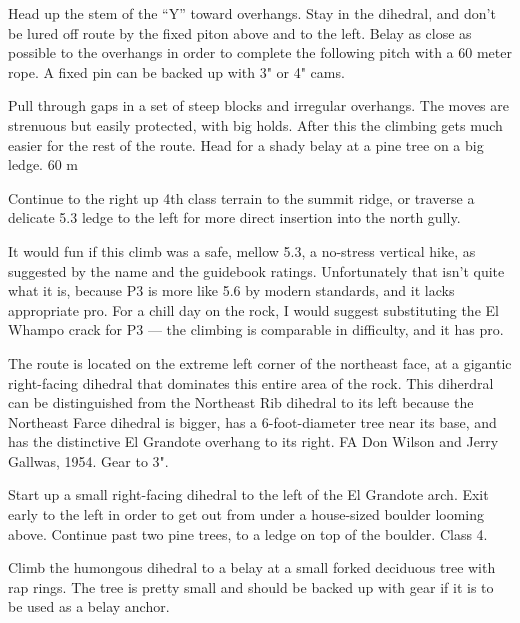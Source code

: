 \documentclass{tahquitz}
\begin{document}
 Head up the stem of the ``Y'' toward overhangs. Stay in the
dihedral, and don't be lured off route by the fixed piton above and
to the left. Belay as close as possible to the overhangs in order to
complete the following pitch with a 60 meter rope. A fixed pin can be
backed up with 3" or 4" cams.

 Pull through gaps in a set of steep blocks and irregular
overhangs. The  moves are strenuous but easily protected, with big
holds. After this the climbing gets much easier for the rest of the
route. Head for a shady belay at a pine tree on a big ledge. 60 m

 Continue to the right up 4th class terrain to the summit ridge,
or traverse a delicate 5.3 ledge to the left for more direct
insertion into the north gully.





It would fun if this climb was a safe, mellow 5.3, a no-stress
vertical hike, as suggested by the name and the guidebook ratings.
Unfortunately that isn't quite what it is, because P3 is more like 5.6
by modern standards, and it lacks appropriate pro. For a chill day on the
rock, I would suggest substituting the El Whampo crack for P3 --- the climbing
is comparable in difficulty, and it has pro.

The route is located on the extreme left corner of the northeast
face, at a gigantic right-facing dihedral that dominates this entire area of the
rock. This diherdral can be distinguished from the Northeast Rib dihedral to its left
because the Northeast Farce dihedral is bigger, has a 6-foot-diameter tree near its base,
and has the distinctive El Grandote overhang to its right.
FA Don Wilson and Jerry Gallwas, 1954. Gear to 3".

 Start up a small right-facing dihedral to the left of the El Grandote arch.
Exit early to the left in order to get out from under a house-sized boulder
looming above. Continue past two pine trees, to
a ledge on top of the boulder.
Class 4.

 Climb the humongous dihedral to a belay at a small forked deciduous tree with rap
rings. The tree is pretty small and should be backed up with gear if it is to be
used as a belay anchor.
\end{document}
